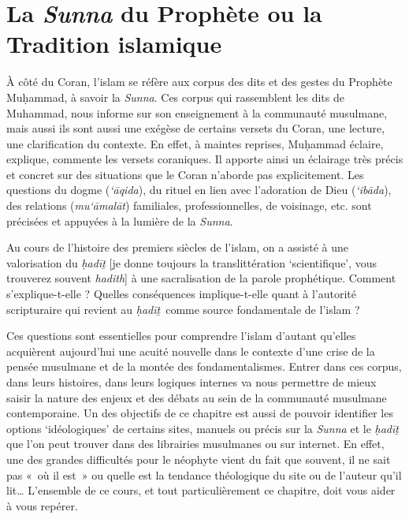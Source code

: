 \chapter{La \emph{Sunna} du Prophète ou la Tradition islamique}

À côté du Coran, l'islam se réfère aux corpus des dits et des gestes du
Prophète Muḥammad, à savoir la \emph{Sunna}. Ces corpus qui rassemblent
les dits de Muhammad, nous informe sur son enseignement à la communauté
musulmane, mais aussi ils sont aussi une exégèse de certains versets du
Coran, une lecture, une clarification du contexte. En effet, à maintes
reprises, Muḥammad éclaire, explique, commente les versets coraniques.
Il apporte ainsi un éclairage très précis et concret sur des situations
que le Coran n'aborde pas explicitement. Les questions du dogme
(\emph{`āqida}), du rituel en lien avec l'adoration de Dieu
(\emph{`ibāda}), des relations (\emph{mu`āmalāt}) familiales,
professionnelles, de voisinage, etc. sont précisées et appuyées à la
lumière de la \emph{Sunna}.

Au cours de l'histoire des premiers siècles de l'islam, on a assisté à
une valorisation du \emph{ḥadīṯ} {[}je donne toujours la
translittération `scientifique', vous trouverez souvent \emph{hadith}{]}
à une sacralisation de la parole prophétique. Comment s'explique-t-elle
? Quelles conséquences implique-t-elle quant à l'autorité scripturaire
qui revient au \emph{ḥadīṯ}~comme source fondamentale de l'islam ?

Ces questions sont essentielles pour comprendre l'islam d'autant
qu'elles acquièrent aujourd'hui une acuité nouvelle dans le contexte
d'une crise de la pensée musulmane et de la montée des fondamentalismes.
Entrer dans ces corpus, dans leurs histoires, dans leurs logiques
internes va nous permettre de mieux saisir la nature des enjeux et des
débats au sein de la communauté musulmane contemporaine. Un des
objectifs de ce chapitre est aussi de pouvoir identifier les options
`idéologiques' de certains sites, manuels ou précis sur la \emph{Sunna}
et le \emph{ḥadīṯ} que l'on peut trouver dans des librairies musulmanes
ou sur internet. En effet, une des grandes difficultés pour le néophyte
vient du fait que souvent, il ne sait pas «~où il est~» ou quelle est la
tendance théologique du site ou de l'auteur qu'il lit\ldots{} L'ensemble
de ce cours, et tout particulièrement ce chapitre, doit vous aider à
vous repérer.



